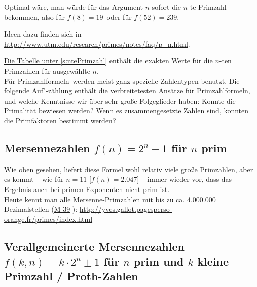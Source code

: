 \begin{refsegment}
Optimal wäre, man würde für das Argument $n$ sofort die $n$-te Primzahl
bekommen, also für
$f(8) = 19\,$ oder für  $f(52) = 239$.

Ideen dazu finden sich in
\url{http://www.utm.edu/research/primes/notes/faq/p_n.html}.


\hyperlink{ntePrimzahl}{Die Tabelle unter \ref{s:ntePrimzahl}} enthält
die exakten Werte für die $n$-ten Primzahlen für ausgewählte $ n.$
\\

Für \glqq Primzahlformeln\grqq~werden meist ganz spezielle Zahlentypen
benutzt. Die folgende Auf"-zählung enthält die verbreitetesten Ansätze
für \glqq Primzahlformeln\grqq, und welche Kenntnisse wir über
sehr große Folgeglieder haben: Konnte die Primalität bewiesen werden?
Wenn es zusammengesetzte Zahlen sind, konnten die Primfaktoren bestimmt werden?


\hypertarget{MersenneNumbers02}{}
\subsection{Mersennezahlen \texorpdfstring{$f(n) = 2^n - 1$ für $ n $}{f(n) = 2\^{}n - 1 für n} prim}
     
    Wie \hyperlink{MersenneNumbers01}{oben} gesehen, liefert diese
    Formel wohl relativ viele große Primzahlen, aber es kommt -- wie
    für $n=11$ [$f(n)=2.047$] -- immer wieder vor, dass das Ergebnis
    auch bei primen Exponenten \hyperlink{Mer-nums-not-always-prim}{nicht}
    prim ist. \\
    Heute kennt man alle Mersenne-Primzahlen mit bis zu ca. 4.000.000
    Dezimalstellen (\hyperlink{M-39}{M-39}
    ):
  \url{http://yves.gallot.pagesperso-orange.fr/primes/index.html}

\subsection
    [Verallgemeinerte Mersennezahlen \texorpdfstring{$f(k,n) = k \cdot 2^n \pm 1$}{f(k,n) = k ... 2\^{}n +- 1} / Proth-Zahlen]
    {Verallgemeinerte Mersennezahlen
    $f(k,n) = k \cdot 2^n \pm 1 $ für $ n $ prim und $ k $ kleine Primzahl
    / Proth-Zahlen\footnotemark}
    \label{generalized-mersenne-no1}


\end{refsegment}
